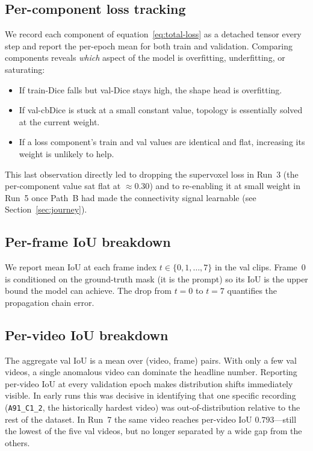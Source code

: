 \documentclass[11pt,a4paper]{article}
\begin{document}
\subsection{Per-component loss tracking}

We record each component of equation~\eqref{eq:total-loss} as a
detached tensor every step and report the per-epoch mean for both train
and validation. Comparing components reveals \emph{which} aspect of
the model is overfitting, underfitting, or saturating:
\begin{itemize}[noitemsep,topsep=3pt]
    \item If train-Dice falls but val-Dice stays high, the shape head
          is overfitting.
    \item If val-cbDice is stuck at a small constant value, topology
          is essentially solved at the current weight.
    \item If a loss component's train and val values are identical and
          flat, increasing its weight is unlikely to help.
\end{itemize}
This last observation directly led to dropping the supervoxel loss
in Run~3 (the per-component value sat flat at $\approx 0.30$) and to
re-enabling it at small weight in Run~5 once Path~B had made the
connectivity signal learnable (see Section~\ref{sec:journey}).

\subsection{Per-frame IoU breakdown}

We report mean IoU at each frame index $t \in \{0, 1, \ldots, 7\}$ in
the val clips. Frame~0 is conditioned on the ground-truth mask (it is
the prompt) so its IoU is the upper bound the model can achieve. The
drop from $t{=}0$ to $t{=}7$ quantifies the propagation chain error.

\subsection{Per-video IoU breakdown}

The aggregate val IoU is a mean over (video, frame) pairs. With only
a few val videos, a single anomalous video can dominate the headline
number. Reporting per-video IoU at every validation epoch makes
distribution shifts immediately visible. In early runs this was
decisive in identifying that one specific recording
(\texttt{A91\_C1\_2}, the historically hardest video) was
out-of-distribution relative to the rest of the dataset. In Run~7
the same video reaches per-video IoU $0.793$---still the lowest of
the five val videos, but no longer separated by a wide gap from the
others.
\end{document}
